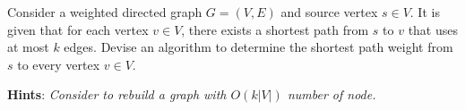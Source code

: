 
Consider a weighted directed graph $ G = (V, E) $ and source vertex $ s \in V $. It is given that for each vertex $ v \in V $, there exists a shortest path from $ s $ to $ v $ that uses at most $ k $ edges. Devise an algorithm to determine the shortest path weight from $ s $ to every vertex $ v \in V $.

\textbf{Hints}: \textit{Consider to rebuild a graph with $O(k|V|)$ number of node.}


